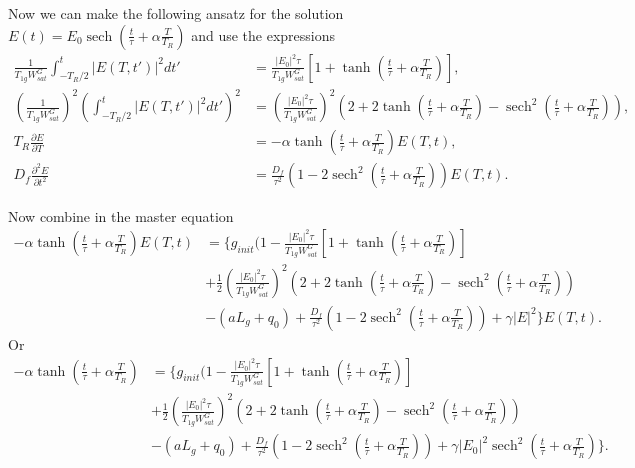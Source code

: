 \documentclass[preprint,secnumarabic,amssymb, nobibnotes, aip, prd]{revtex4-1}
\def\p{\partial}
\DeclareMathOperator{\sech}{sech}
\begin{document}
Now we can make the following ansatz for the solution $E(t) = E_0 \sech(\frac{t}{\tau} +\alpha \frac{T}{T_R})$ and use the expressions~\cite{haus1975theoryslow}
\begin{align}
\frac{1}{T_{1g}W_{sat}^G}\int_{-T_R/2}^{t} |E(T,t')|^2dt' &= \frac{|E_0|^2\tau}{T_{1g}W_{sat}^G} [1+\tanh(\frac{t}{\tau}+\alpha \frac{T}{T_R})], \\ 
(\frac{1}{T_{1g}W_{sat}^G})^2\left (\int_{-T_R/2}^{t} |E(T,t')|^2dt' \right)^2 &=  \left(\frac{|E_0|^2\tau}{T_{1g}W_{sat}^G}\right)^2 \left(2+2\tanh(\frac{t}{\tau}+\alpha \frac{T}{T_R}) - \sech^2(\frac{t}{\tau}+\alpha \frac{T}{T_R})\right), \\
T_R\frac{\p E}{\p T} &= -\alpha \tanh(\frac{t}{\tau}+\alpha \frac{T}{T_R}) E(T,t), \\
D_f\frac{\p^2 E}{\p t^2} &= \frac{D_f}{\tau^2}\left( 1-2\sech^2(\frac{t}{\tau}+\alpha \frac{T}{T_R}) \right) E(T,t).
\end{align}

Now combine in the master equation 
\begin{align}
\label{eq:master-equation2}
-\alpha \tanh(\frac{t}{\tau}+\alpha \frac{T}{T_R}) E(T,t) &=  \{ g_{init}(1 - \frac{|E_0|^2\tau}{T_{1g}W_{sat}^G} [1+\tanh(\frac{t}{\tau}+\alpha \frac{T}{T_R})]  \nonumber \\
&  +\frac{1}{2} \left(\frac{|E_0|^2\tau}{T_{1g}W_{sat}^G}\right)^2 \left(2+2\tanh(\frac{t}{\tau}+\alpha \frac{T}{T_R}) - \sech^2(\frac{t}{\tau}+\alpha \frac{T}{T_R})\right)  \nonumber \\
&  -(aL_g+q_0)  + \frac{D_f}{\tau^2}\left( 1-2\sech^2(\frac{t}{\tau}+\alpha \frac{T}{T_R}) \right) + \gamma |E|^2  \}E(T,t).
\end{align}
Or 
\begin{align}
\label{eq:master-equation3}
-\alpha \tanh(\frac{t}{\tau}+\alpha \frac{T}{T_R}) &=  \{ g_{init}(1 - \frac{|E_0|^2\tau}{T_{1g}W_{sat}^G} [1+\tanh(\frac{t}{\tau}+\alpha \frac{T}{T_R})]  \nonumber \\
&  +\frac{1}{2} \left(\frac{|E_0|^2\tau}{T_{1g}W_{sat}^G}\right)^2 \left(2+2\tanh(\frac{t}{\tau}+\alpha \frac{T}{T_R}) - \sech^2(\frac{t}{\tau}+\alpha \frac{T}{T_R})\right)  \nonumber \\
&  -(aL_g+q_0)  + \frac{D_f}{\tau^2}\left( 1-2\sech^2(\frac{t}{\tau}+\alpha \frac{T}{T_R}) \right) + \gamma |E_0|^2\sech^2(\frac{t}{\tau}+\alpha \frac{T}{T_R})  \}.
\end{align}
\end{document}
